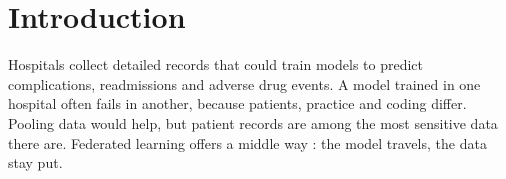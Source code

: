 \chapter{Introduction}
\label{ch:introduction}

Hospitals collect detailed records that could train models to predict complications,
readmissions and adverse drug events. A model trained in one hospital often fails in another,
because patients, practice and coding differ. Pooling data would help, but patient records are
among the most sensitive data there are. Federated learning offers a middle way
\citep{mcmahan2017}: the model travels, the data stay put.
